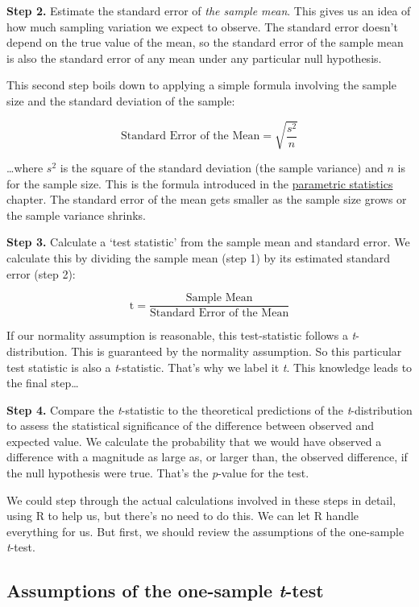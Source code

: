 \documentclass[
]{book}
\begin{document}
\textbf{Step 2.} Estimate the standard error of \emph{the sample mean}. This gives us an idea of how much sampling variation we expect to observe. The standard error doesn't depend on the true value of the mean, so the standard error of the sample mean is also the standard error of any mean under any particular null hypothesis.

This second step boils down to applying a simple formula involving the sample size and the standard deviation of the sample:

\[\text{Standard Error of the Mean} = \sqrt{\frac{s^2}{n}}\]

\ldots where \(s^2\) is the square of the standard deviation (the sample variance) and \(n\) is for the sample size. This is the formula introduced in the \protect\hyperlink{parametric-statistics}{parametric statistics} chapter. The standard error of the mean gets smaller as the sample size grows or the sample variance shrinks.

\textbf{Step 3.} Calculate a `test statistic' from the sample mean and standard error. We calculate this by dividing the sample mean (step 1) by its estimated standard error (step 2):

\[\text{t} = \frac{\text{Sample Mean}}{\text{Standard Error of the Mean}}\]

If our normality assumption is reasonable, this test-statistic follows a \emph{t}-distribution. This is guaranteed by the normality assumption. So this particular test statistic is also a \emph{t}-statistic. That's why we label it \emph{t}. This knowledge leads to the final step\ldots{}

\textbf{Step 4.} Compare the \emph{t}-statistic to the theoretical predictions of the \emph{t}-distribution to assess the statistical significance of the difference between observed and expected value. We calculate the probability that we would have observed a difference with a magnitude as large as, or larger than, the observed difference, if the null hypothesis were true. That's the \emph{p}-value for the test.

We could step through the actual calculations involved in these steps in detail, using R to help us, but there's no need to do this. We can let R handle everything for us. But first, we should review the assumptions of the one-sample \emph{t}-test.

\hypertarget{assumptions-of-the-one-sample-t-test}{%
\subsection{\texorpdfstring{Assumptions of the one-sample \emph{t}-test}{Assumptions of the one-sample t-test}}\label{assumptions-of-the-one-sample-t-test}}
\end{document}
